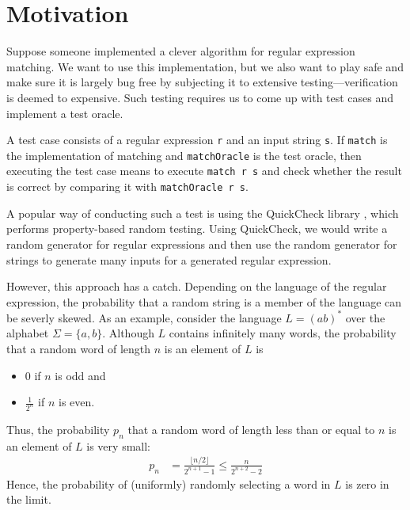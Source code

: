 \section{Motivation}
\label{sec:motivation}

Suppose someone implemented a clever algorithm for
regular expression matching. 
We want to use this implementation, but we also want to play safe and
make sure it is largely bug free by subjecting it to extensive
testing---verification is deemed to expensive.
Such testing requires us to come up with test cases and
implement a test oracle.


A test case consists of a regular expression \texttt{r} and an input
string \texttt{s}. If \texttt{match} is the implementation of matching
and \texttt{matchOracle} is the test oracle, then
executing the test case means to execute \texttt{match r
  s} and check whether the result is correct by comparing it with
\texttt{matchOracle r s}. 

A popular way of conducting such a test is using the QuickCheck library
\cite{quickcheck}, which performs property-based random testing. Using
QuickCheck, we would write a random generator for regular expressions
and then use the random generator for strings to generate many inputs for a
generated regular expression.

However, this approach has a
catch. Depending on the language of the regular expression, the
probability that a random string is a member of the language can be
severly skewed. As an example, consider the language $L = (ab)^*$ over the
alphabet $\Sigma = \{a, b\}$. Although $L$ contains infinitely many
words, the probability that a random word of
length $n$ is an element of $L$ is
\begin{itemize}
\item $0$ if $n$ is odd and
\item $\frac{1}{2^n}$ if $n$ is even.
\end{itemize}
Thus, the probability $p_n$ that a random word of length less than or equal to
$n$ is an element of $L$ is very small:
\begin{align*}
  p_n &= \frac{\lfloor n/2 \rfloor}{2^{n+1} - 1}
        \le \frac{n}{2^{n+2} - 2}
\end{align*}
Hence, the probability of (uniformly) randomly
selecting a word in $L$ is zero in the limit.

